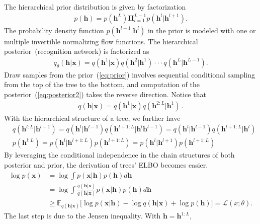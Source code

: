 \documentclass{article}
\begin{document}
The hierarchical prior distribution is given by factorization
\begin{align}\label{eq:prior}
p(\mathbf{h}) =  p( \mathbf{h}^{L})\mathbf{\Pi}_{l=1}^{L-1}p(\mathbf{h}^{l} | \mathbf{h}^{l+1}) .
\end{align}
The probability density function $p(\mathbf{h}^{l-1} | \mathbf{h}^{l})$ in the prior is modeled with one or multiple invertible normalizing flow functions. The hierarchical posterior~(recognition network) is factorized as
\begin{align}\label{eq:posterior2}
q_{\theta}(\mathbf{h}| \mathbf{x}) =  q(\mathbf{h}^1 | \mathbf{x})  q(\mathbf{h}^2 | \mathbf{h}^1) \cdot \cdot  \cdot  q(\mathbf{h}^{L} | \mathbf{h}^{L-1}).
\end{align}
Draw samples from the prior~(\ref{eq:prior})
involves sequential conditional sampling from the top of the tree to the bottom, and computation of the posterior~(\ref{eq:posterior2}) takes the reverse direction. Notice that
\begin{align*} %
q(\mathbf{h}| \mathbf{x}) = q(\mathbf{h}^1 | \mathbf{x})  q(\mathbf{h}^{2:L} | \mathbf{h}^1) \, .
\end{align*}
With the hierarchical structure of a tree, we further have
\begin{align} \label{eq:chain_post}
&q(\mathbf{h}^{l:L}|\mathbf{h}^{l-1}) = q(\mathbf{h}^{l}|\mathbf{h}^{l-1}) q(\mathbf{h}^{l+1:L}|\mathbf{h}^{l}\mathbf{h}^{l-1})=q(\mathbf{h}^{l}|\mathbf{h}^{l-1}) q(\mathbf{h}^{l+1:L}|\mathbf{h}^{l})  \\ \label{eq:chain_prior}
& p(\mathbf{h}^{l:L})=  p(\mathbf{h}^{l}|\mathbf{h}^{l+1:L})p(\mathbf{h}^{l+1:L})=p(\mathbf{h}^{l}|\mathbf{h}^{l+1})p(\mathbf{h}^{l+1:L})
\end{align}
By leveraging  the conditional independence  in the chain structures of both posterior and prior, the derivation of trees' ELBO becomes easier.
\begin{align*}
\log p(\mathbf{x}) &= \log \int p(\mathbf{x}|\mathbf{h})p(\mathbf{h}) d \mathbf{h} \\
&= \log \int \frac{q(\mathbf{h}|\mathbf{x})}{q(\mathbf{h}|\mathbf{x})} p(\mathbf{x}|\mathbf{h})p(\mathbf{h}) d \mathbf{h} \\
& \geqslant \mathbb{E}_{q(\mathbf{h}|\mathbf{x})}\big[ \log p(\mathbf{x}|\mathbf{h}) -  \log q(\mathbf{h}|\mathbf{x}) +  \log p(\mathbf{h}) \big] = \mathcal{L}(x; \theta).
\end{align*}
The last step is due to the Jensen inequality. With $\mathbf{h} =\mathbf{h}^{1:L} $, 
\end{document}
